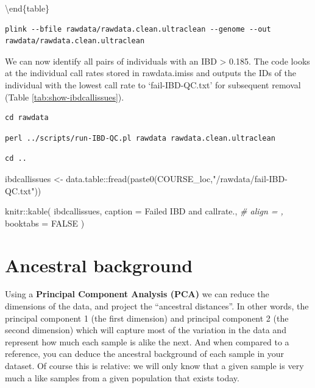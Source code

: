 \documentclass[
]{book}
\newenvironment{Shaded}{\begin{snugshade}}{\end{snugshade}}
\newcommand{\AttributeTok}[1]{\textcolor[rgb]{0.77,0.63,0.00}{#1}}
\newcommand{\CommentTok}[1]{\textcolor[rgb]{0.56,0.35,0.01}{\textit{#1}}}
\newcommand{\ConstantTok}[1]{\textcolor[rgb]{0.00,0.00,0.00}{#1}}
\newcommand{\FunctionTok}[1]{\textcolor[rgb]{0.00,0.00,0.00}{#1}}
\newcommand{\NormalTok}[1]{#1}
\newcommand{\OtherTok}[1]{\textcolor[rgb]{0.56,0.35,0.01}{#1}}
\newcommand{\SpecialCharTok}[1]{\textcolor[rgb]{0.00,0.00,0.00}{#1}}
\newcommand{\StringTok}[1]{\textcolor[rgb]{0.31,0.60,0.02}{#1}}
\begin{document}
\textbackslash end\{table\}

\begin{verbatim}
plink --bfile rawdata/rawdata.clean.ultraclean --genome --out rawdata/rawdata.clean.ultraclean
\end{verbatim}

We can now identify all pairs of individuals with an IBD \textgreater{} 0.185. The code looks at the individual call rates stored in rawdata.imiss and outputs the IDs of the individual with the lowest call rate to `fail-IBD-QC.txt' for subsequent removal (Table \ref{tab:show-ibdcallissues}).

\begin{verbatim}
cd rawdata
\end{verbatim}

\begin{verbatim}
perl ../scripts/run-IBD-QC.pl rawdata rawdata.clean.ultraclean
\end{verbatim}

\begin{verbatim}
cd ..
\end{verbatim}

\begin{Shaded}
\begin{Highlighting}[]
\NormalTok{ibdcallissues }\OtherTok{\textless{}{-}}\NormalTok{ data.table}\SpecialCharTok{::}\FunctionTok{fread}\NormalTok{(}\FunctionTok{paste0}\NormalTok{(COURSE\_loc,}\StringTok{"/rawdata/fail{-}IBD{-}QC.txt"}\NormalTok{))}
\end{Highlighting}
\end{Shaded}

\begin{Shaded}
\begin{Highlighting}[]
\NormalTok{knitr}\SpecialCharTok{::}\FunctionTok{kable}\NormalTok{(}
\NormalTok{  ibdcallissues, }
  \AttributeTok{caption =} \StringTok{\textquotesingle{}Failed IBD and callrate.\textquotesingle{}}\NormalTok{,}
  \CommentTok{\# align = ,}
  \AttributeTok{booktabs =} \ConstantTok{FALSE}
\NormalTok{)}
\end{Highlighting}
\end{Shaded}

\hypertarget{ancestral-background}{%
\section{Ancestral background}\label{ancestral-background}}

Using a \textbf{Principal Component Analysis (PCA)} we can reduce the dimensions of the data, and project the ``ancestral distances''. In other words, the principal component 1 (the first dimension) and principal component 2 (the second dimension) which will capture most of the variation in the data and represent how much each sample is alike the next. And when compared to a reference, you can deduce the ancestral background of each sample in your dataset. Of course this is relative: we will only know that a given sample is very much a like samples from a given population that exists today.
\end{document}
